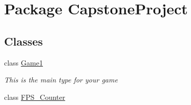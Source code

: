 \hypertarget{namespace_capstone_project}{\section{Package Capstone\-Project}
\label{dc/dd1/namespace_capstone_project}
}
\subsection*{Classes}
\begin{DoxyCompactItemize}
\item 
class \hyperlink{class_capstone_project_1_1_game1}{Game1}
\begin{DoxyCompactList}\small\item\em This is the main type for your game \end{DoxyCompactList}\item 
class \hyperlink{class_capstone_project_1_1_f_p_s___counter}{F\-P\-S\-\_\-\-Counter}
\end{DoxyCompactItemize}
